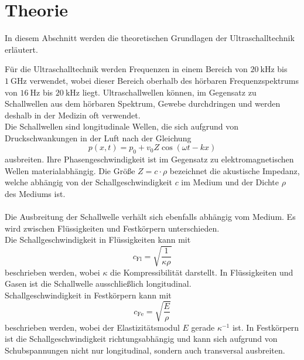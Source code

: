 \section{Theorie}
\label{sec:theorie}

    In diesem Abschnitt werden die theoretischen Grundlagen der Ultraschalltechnik erläutert.

    Für die Ultraschalltechnik werden Frequenzen in einem Bereich von $\SI{20}{\kilo\hertz}$ bis $\SI{1}{\giga\hertz}$ verwendet,
    wobei dieser Bereich oberhalb des hörbaren Frequenzspektrums von $\SI{16}{\hertz}$ bis $\SI{20}{\kilo\hertz}$ liegt.
    Ultraschallwellen können,
    im Gegensatz zu Schallwellen aus dem hörbaren Spektrum,
    Gewebe durchdringen
    und werden deshalb in der Medizin oft verwendet.\\
    Die Schallwellen sind longitudinale Wellen,
    die sich aufgrund von Druckschwankungen in der Luft nach der Gleichung
    \begin{equation}
        p(x,t) = p_0 + v_0 Z \cos{(\omega t - kx)}
    \end{equation}
    ausbreiten.
    Ihre Phasengeschwindigkeit ist im Gegensatz zu elektromagnetischen Wellen materialabhängig.
    Die Größe $Z = c \cdot \rho$ bezeichnet die akustische Impedanz,
    welche abhängig von der Schallgeschwindigkeit $c$ im Medium und der Dichte $\rho$ des Mediums ist.\\
    \\
    Die Ausbreitung der Schallwelle verhält sich ebenfalls abhängig vom Medium.
    Es wird zwischen Flüssigkeiten und Festkörpern unterschieden.\\
    Die Schallgeschwindigkeit in Flüssigkeiten kann mit
    \begin{equation}
        c_\text{Fl} = \sqrt{\frac{1}{\kappa \rho}}
        \label{eqn:schallgeschwindigkeit_flüssigkeit}
    \end{equation}
    beschrieben werden,
    wobei $\kappa$ die Kompressibilität darstellt.
    In Flüssigkeiten und Gasen ist die Schallwelle ausschließlich longitudinal.\\
    Schallgeschwindigkeit in Festkörpern kann mit
    \begin{equation}
        c_\text{Fe} = \sqrt{\frac{E}{\rho}}
        \label{eqn:schallgeschwindigkeit_festkörper}
    \end{equation}
    beschrieben werden,
    wobei der Elastizitätsmodul $E$ gerade $\kappa^{-1}$ ist.
    In Festkörpern ist die Schallgeschwindigkeit richtungsabhängig
    und kann sich aufgrund von Schubspannungen nicht nur longitudinal,
    sondern auch transversal ausbreiten.


